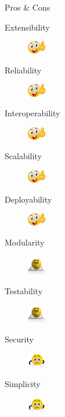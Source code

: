\documentclass{slide}
\begin{document}
\begin{frame}{Pros \& Cons}
    \vspace{1mm}
    {\LARGE
    \begin{description}
        \item[Extensibility] \tabto{15em}\includegraphics[width=8mm]{../../shared/images/thumbs-up.png}
        \item[Reliability] \tabto{15em}\includegraphics[width=8mm]{../../shared/images/thumbs-up.png}
        \item[Interoperability] \tabto{15em}\includegraphics[width=8mm]{../../shared/images/thumbs-up.png}
        \item[Scalability] \tabto{15em}\includegraphics[width=8mm]{../../shared/images/thumbs-up.png}
        \item[Deployability] \tabto{15em}\includegraphics[width=8mm]{../../shared/images/thumbs-up.png}
        \item[Modularity] \tabto{15em}\includegraphics[width=8mm]{../../shared/images/neutral.png}
        \item[Testability] \tabto{15em}\includegraphics[trim=22 19 22 12,clip,width=8mm]{../../shared/images/neutral.png}
        \item[Security] \tabto{15em}\includegraphics[trim=22 19 22 12,clip,width=8mm]{../../shared/images/thumbs-down.png}
        \item[Simplicity] \tabto{15em}\includegraphics[trim=22 19 22 12,clip,width=8mm]{../../shared/images/thumbs-down.png}
    \end{description}
    }
\end{frame}
\end{document}
